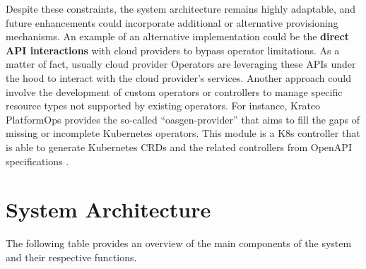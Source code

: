 Despite these constraints, the system architecture remains highly adaptable, and future enhancements could incorporate additional or alternative provisioning mechanisms. 
An example of an alternative implementation could be the \textbf{direct API interactions} with cloud providers to bypass operator limitations. As a matter of fact, usually cloud provider Operators are leveraging these APIs under the hood to interact with the cloud provider’s services.
Another approach could involve the development of custom operators or controllers to manage specific resource types not supported by existing operators.
For instance, Krateo PlatformOps provides the so-called ``oasgen-provider'' that aims to fill the gaps of missing or incomplete Kubernetes operators. This module is a K8s controller that is able to generate Kubernetes CRDs and the related controllers from OpenAPI specifications \cite{krateo_oasgen_provider}. 

\newpage

\section{System Architecture}
\label{sec:system_architecture}

The following table provides an overview of the main components of the system and their respective functions.

